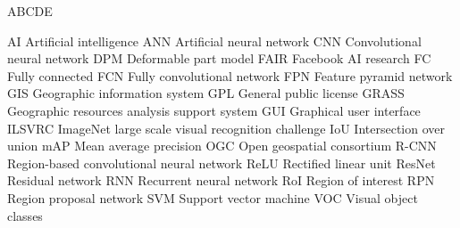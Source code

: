 
\begin{seznamzkratek}{ABCDE}

	      {AI}
	      {Artificial intelligence}
	      {ANN}
	      {Artificial neural network}
	      {CNN}
	      {Convolutional neural network}
	      {DPM}
	      {Deformable part model}
	      {FAIR}
	      {Facebook AI research}
	      {FC}
	      {Fully connected}
	      {FCN}
	      {Fully convolutional network}
	      {FPN}
	      {Feature pyramid network}
	      {GIS}
	      {Geographic information system}
	      {GPL}
	      {General public license}
	      {GRASS}
	      {Geographic resources analysis support system}
	      {GUI}
	      {Graphical user interface}
	      {ILSVRC}
	      {ImageNet large scale visual recognition challenge}
	      {IoU}
	      {Intersection over union}
	      {mAP}
	      {Mean average precision}
	      {OGC}
	      {Open geospatial consortium}
	      {R-CNN}
	      {Region-based convolutional neural network}
	      {ReLU}
	      {Rectified linear unit}
	      {ResNet}
	      {Residual network}
	      {RNN}
	      {Recurrent neural network}
	      {RoI}
	      {Region of interest}
	      {RPN}
	      {Region proposal network}
	      {SVM}
	      {Support vector machine}
	      {VOC}
	      {Visual object classes}
	      
\end{seznamzkratek}